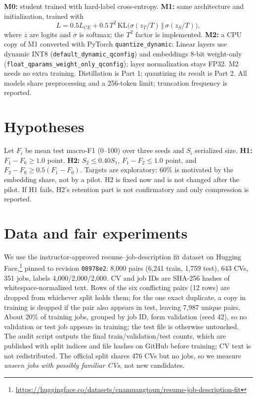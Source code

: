 \documentclass[11pt]{article}
\begin{document}
\textbf{M0:} student trained with hard-label cross-entropy. \textbf{M1:} same architecture and initialization, trained with
\begin{equation}
L=0.5L_{CE}+0.5\,T^2\,\mathrm{KL}\big(\sigma(z_T/T)\,\Vert\,\sigma(z_S/T)\big),
\end{equation}
where $z$ are logits and $\sigma$ is softmax; the $T^2$ factor is implemented. \textbf{M2:} a CPU copy of M1 converted with PyTorch \texttt{quantize\_dynamic}: Linear layers use dynamic INT8 (\texttt{default\_dynamic\_qconfig}) and embeddings 8-bit weight-only (\texttt{float\_qparams\_weight\_only\_qconfig}); layer normalization stays FP32. M2 needs no extra training. Distillation is Part 1; quantizing its result is Part 2. All models share preprocessing and a 256-token limit; truncation frequency is reported.

\section{Hypotheses}
Let $F_i$ be mean test macro-F1 (0--100) over three seeds and $S_i$ serialized size.
\textbf{H1:} $F_1-F_0\geq1.0$ point.
\textbf{H2:} $S_2\leq0.40S_1$, $F_1-F_2\leq1.0$ point, and $F_2-F_0\geq0.5(F_1-F_0)$.
Targets are exploratory: 60\% is motivated by the embedding share, not by a pilot. H2 is fixed now and is not changed after the pilot. If H1 fails, H2's retention part is not confirmatory and only compression is reported.

\section{Data and fair experiments}
We use the instructor-approved resume--job-description fit dataset on Hugging Face,\footnote{\url{https://huggingface.co/datasets/cnamuangtoun/resume-job-description-fit}} pinned to revision \texttt{08978e2}: 8,000 pairs (6,241 train, 1,759 test), 643 CVs, 351 jobs, labels 4,000/2,000/2,000. CV and job IDs are SHA-256 hashes of whitespace-normalized text. Rows of the six conflicting pairs (12 rows) are dropped from whichever split holds them; for the one exact duplicate, a copy in training is dropped if the pair also appears in test, leaving 7,987 unique pairs. About 20\% of training jobs, grouped by job ID, form validation (seed 42), so no validation or test job appears in training; the test file is otherwise untouched. The audit script outputs the final train/validation/test counts, which are published with split indices and file hashes on GitHub before training; CV text is not redistributed. The official split shares 476 CVs but no jobs, so we measure \emph{unseen jobs with possibly familiar CVs}, not new candidates.
\end{document}
